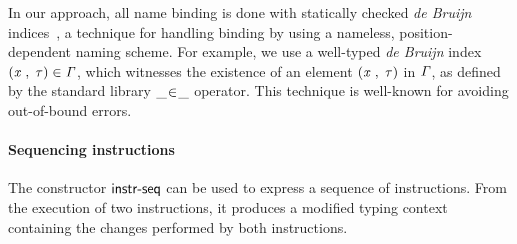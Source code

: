 \documentclass[sigconf]{acmart}
\theoremstyle{definition}
\def\resethooks{%
  \global\let\SaveRestoreHook\empty
  \global\let\ColumnHook\empty}
\newcommand{\hsindent}[1]{\quad}%
\newcommand{\D}[1]{\blue{\mathsf{#1}}}
\newcommand{\Con}[1]{\red{\mathsf{#1}}}
\newcommand{\F}[1]{\green{\mathsf{#1}}}
\newcommand{\V}[1]{\purple{\mathit{#1}}}
\begin{document}
\resethooks


In our approach, all name binding is done with statically checked \emph{de Bruijn} indices~\cite{DEBRUIJN72}, a technique for handling binding by using a nameless, position-dependent naming scheme. For example, we use a well-typed \emph{de Bruijn} index \ensuremath{(\V{x}\;\red{,}\,\;\V{\tau})\;\D{\in}\;\V{\Gamma}}, which witnesses the existence of an element \ensuremath{(\V{x}\;\red{,}\,\;\V{\tau})} in \ensuremath{\V{\Gamma}}, as defined by the standard library \ensuremath{\D{\_\hspace{-2pt}\in\hspace{-2pt}\_}} operator. This technique is well-known for avoiding out-of-bound errors.

\paragraph{Sequencing instructions}{The constructor \ensuremath{\Con{instr\textrm{-}seq}} can be used to express a sequence of instructions. From the execution of two instructions, it produces a modified typing context containing the changes performed by both instructions.}
\end{document}
